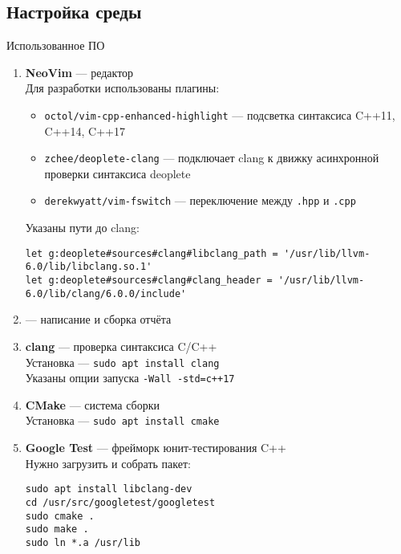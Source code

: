 \documentclass[a4paper, 14pt]{extarticle}
\begin{document}
\subsection{Настройка среды}
Использованное ПО
\begin{enumerate}
    \item \textbf{NeoVim} --- редактор\\
    Для разработки использованы плагины:
    \begin{itemize}
        \item \texttt{octol/vim-cpp-enhanced-highlight} --- подсветка синтаксиса C++11, C++14, C++17
        \item \texttt{zchee/deoplete-clang} --- подключает clang к движку асинхронной проверки синтаксиса deoplete
        \item \texttt{derekwyatt/vim-fswitch} --- переключение между \texttt{.hpp} и \texttt{.cpp}\\
    \end{itemize}

    Указаны пути до clang:
    \begin{lstlisting}
let g:deoplete#sources#clang#libclang_path = '/usr/lib/llvm-6.0/lib/libclang.so.1'
let g:deoplete#sources#clang#clang_header = '/usr/lib/llvm-6.0/lib/clang/6.0.0/include'
    \end{lstlisting}

    \item \XeLaTeX{} --- написание и сборка отчёта

    \item \textbf{clang} --- проверка синтаксиса C/C++\\
    Установка --- \texttt{sudo apt install clang}\\
    Указаны опции запуска \texttt{-Wall -std=c++17}

    \item \textbf{CMake} --- система сборки\\
    Установка --- \texttt{sudo apt install cmake}

    \item \textbf{Google Test} --- фрейморк юнит-тестирования C++\\
    Нужно загрузить и собрать пакет:
    \begin{lstlisting}
sudo apt install libclang-dev
cd /usr/src/googletest/googletest
sudo cmake .
sudo make .
sudo ln *.a /usr/lib
    \end{lstlisting}
\end{enumerate}
\end{document}
